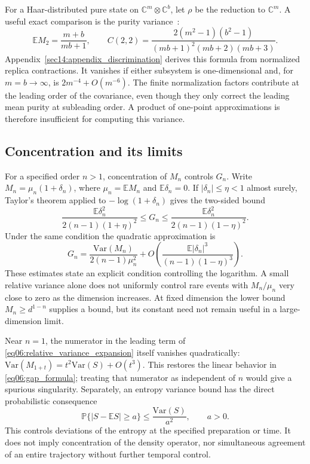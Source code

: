 \documentclass[11pt,letterpaper]{article}
\theoremstyle{plain}
\theoremstyle{definition}
\theoremstyle{remark}
\newcommand{\E}{\mathbb{E}}
\newcommand{\Var}{\text{Var}}
\newcommand{\Prob}{\mathbb{P}}
\begin{document}
For a Haar-distributed pure state on $\mathbb C^m\otimes\mathbb C^b$,
let $\rho$ be the reduction to $\mathbb C^m$.  A useful exact comparison
is the purity variance~\citep{giraud2007}:
\begin{equation}
 \E M_2=\frac{m+b}{mb+1},\qquad
 C(2,2)=\frac{2(m^2-1)(b^2-1)}{(mb+1)^2(mb+2)(mb+3)}.
 \label{eq06:haar_purity_variance}
\end{equation}
Appendix~\ref{sec14:appendix_discrimination} derives this formula
from normalized replica contractions.  It vanishes if either subsystem
is one-dimensional and, for $m=b\to\infty$, is $2m^{-4}+O(m^{-6})$.
The finite normalization factors contribute at the leading order of
the covariance, even though they only correct the leading mean purity
at subleading order.  A product of one-point approximations is therefore
insufficient for computing this variance.

\subsection{Concentration and its limits}
\label{subsec06:self_averaging}

For a specified order $n>1$, concentration of $M_n$ controls $G_n$.
Write $M_n=\mu_n(1+\delta_n)$, where $\mu_n=\E M_n$ and
$\E\delta_n=0$.  If $|\delta_n|\leq\eta<1$ almost surely, Taylor's
theorem applied to $-\log(1+\delta_n)$ gives the two-sided bound
\begin{equation}
 \frac{\E\delta_n^2}{2(n-1)(1+\eta)^2}
 \leq G_n\leq
 \frac{\E\delta_n^2}{2(n-1)(1-\eta)^2}.
 \label{eq06:gap_bound}
\end{equation}
Under the same condition the quadratic approximation is
\begin{equation}
 G_n=\frac{\Var(M_n)}{2(n-1)\mu_n^2}
 +O\!\left(\frac{\E|\delta_n|^3}{(n-1)(1-\eta)^3}\right).
 \label{eq06:relative_variance_expansion}
\end{equation}
These estimates state an explicit condition controlling the logarithm.
A small relative variance alone does not uniformly control rare events
with $M_n/\mu_n$ very close to zero as the dimension increases.  At
fixed dimension the lower bound $M_n\geq d^{1-n}$ supplies a bound,
but its constant need not remain useful in a large-dimension limit.

Near $n=1$, the numerator in the leading term of
\eqref{eq06:relative_variance_expansion} itself vanishes quadratically:
$\Var(M_{1+t})=t^2\Var(S)+O(t^3)$.  This restores the linear behavior
in \eqref{eq06:gap_formula}; treating that numerator as independent of
$n$ would give a spurious singularity.  Separately, an entropy variance
bound has the direct probabilistic consequence
\begin{equation}
 \Prob\{|S-\E S|\geq a\}\leq\frac{\Var(S)}{a^2},\qquad a>0.
 \label{eq06:entropy_concentration}
\end{equation}
This controls deviations of the entropy at the specified preparation
or time.  It does not imply concentration of the density operator, nor
simultaneous agreement of an entire trajectory without further temporal
control.
\end{document}
